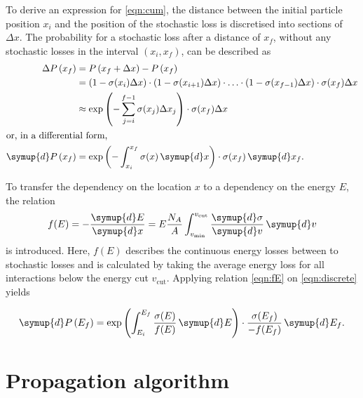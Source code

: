 To derive an expression for \ref{eqn:cum}, the distance between the initial particle position $x_i$ and the position of the stochastic loss is discretised into sections of $\Delta x$.
The probability for a stochastic loss after a distance of $x_f$, without any stochastic losses in the interval $\left(x_i, x_f\right)$, can be described as
\begin{equation}
	\label{eqn:discrete}
	\begin{split}
	\Delta P\left(x_f\right) &= P\left( x_f + \Delta x \right) - P\left( x_f \right)\\
	&= \left( 1 - \sigma(x_i) \Delta x \right) \cdot \left( 1 - \sigma(x_{i+1}) \Delta x \right) \cdot\ldots\cdot \left( 1 - \sigma(x_{f-1}) \Delta x \right) \cdot \sigma(x_f) \Delta x \\
	&\approx \exp \left( - \sum_{j=i}^{f-1} \sigma(x_j) \Delta x_j \right) \cdot \sigma(x_f) \Delta x\\
	\intertext{or, in a differential form,}
	\symup{d}P\left( x_f \right) &= \exp\left(-\int_{x_i}^{x_f} \sigma(x) \, \symup{d}x \right) \cdot \sigma(x_f) \, \symup{d} x_f.
	\end{split}
\end{equation}

To transfer the dependency on the location $x$ to a dependency on the energy $E$, the relation
\begin{equation}
	\label{eqn:fE}
	f(E) = -\frac{\symup{d}E}{\symup{d}x} = E \frac{N_A}{A} \int_{v_\text{min}}^{v_\text{cut}} \frac{\symup{d}\sigma}{\symup{d}v} \, \symup{d}v
\end{equation}
is introduced.
Here, $f(E)$ describes the continuous energy losses between to stochastic losses and is calculated by taking the average energy loss for all interactions below the energy cut $v_\text{cut}$.
Applying relation \ref{eqn:fE} on \ref{eqn:discrete} yields

\begin{equation}
	\label{eqn:discrete_energy}
	\symup{d}P\left(E_f\right) = \exp \left( \int_{E_i}^{E_f} \frac{\sigma(E)}{ f(E) } \, \symup{d}E \right) \cdot \frac{\sigma(E_f)}{-f(E_f)} \, \symup{d}E_f.
\end{equation}


\section{Propagation algorithm}
\label{sec:algorithm}
